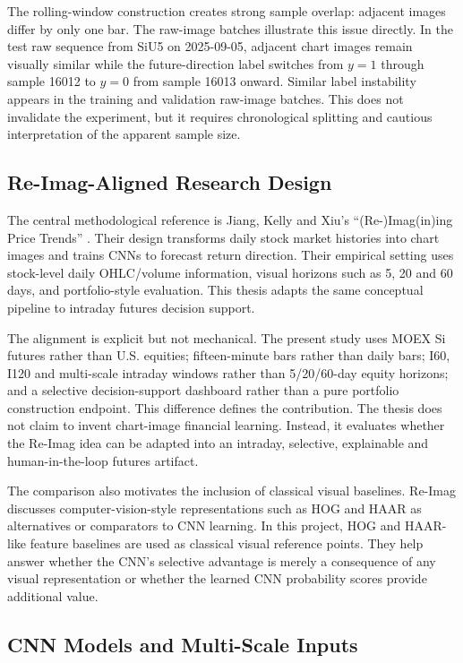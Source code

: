 The rolling-window construction creates strong sample overlap: adjacent images differ by only one bar. The raw-image batches illustrate this issue directly. In the test raw sequence from SiU5 on 2025-09-05, adjacent chart images remain visually similar while the future-direction label switches from \(y=1\) through sample 16012 to \(y=0\) from sample 16013 onward. Similar label instability appears in the training and validation raw-image batches. This does not invalidate the experiment, but it requires chronological splitting and cautious interpretation of the apparent sample size.

\subsection{Re-Imag-Aligned Research Design}
\label{subsec:reimag_design}

The central methodological reference is Jiang, Kelly and Xiu's ``(Re-)Imag(in)ing Price Trends'' \cite{jiang_reimagining_price_trends}. Their design transforms daily stock market histories into chart images and trains CNNs to forecast return direction. Their empirical setting uses stock-level daily OHLC/volume information, visual horizons such as 5, 20 and 60 days, and portfolio-style evaluation. This thesis adapts the same conceptual pipeline to intraday futures decision support.

The alignment is explicit but not mechanical. The present study uses MOEX Si futures rather than U.S. equities; fifteen-minute bars rather than daily bars; I60, I120 and multi-scale intraday windows rather than 5/20/60-day equity horizons; and a selective decision-support dashboard rather than a pure portfolio construction endpoint. This difference defines the contribution. The thesis does not claim to invent chart-image financial learning. Instead, it evaluates whether the Re-Imag idea can be adapted into an intraday, selective, explainable and human-in-the-loop futures artifact.

The comparison also motivates the inclusion of classical visual baselines. Re-Imag discusses computer-vision-style representations such as HOG and HAAR as alternatives or comparators to CNN learning. In this project, HOG and HAAR-like feature baselines are used as classical visual reference points. They help answer whether the CNN's selective advantage is merely a consequence of any visual representation or whether the learned CNN probability scores provide additional value.

\subsection{CNN Models and Multi-Scale Inputs}
\label{subsec:cnn_models}

